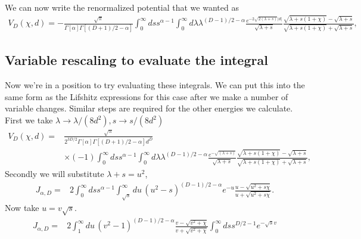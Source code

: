 We can now write the renormalized potential that we wanted as 
\begin{align}
V_D(\chi,d)=-\frac{\sqrt{\pi}}{\Gamma[\alpha]\Gamma\left[(D+1)/2-\alpha\right]}
\int_0^\infty ds s^{\alpha-1}\int_0^\infty d\lambda \lambda^{(D-1)/2-\alpha}
\frac{e^{-2\sqrt{2(\lambda+s)}|d|}}{\sqrt{\lambda+s}} 
\frac{\sqrt{\lambda+s(1+\chi)}-\sqrt{\lambda+s}}{\sqrt{\lambda+s(1+\chi)}+\sqrt{\lambda+s}},
\end{align}

\subsection{Variable rescaling to evaluate the integral}
Now we're in a position to try evaluating these integrals.
  We can put this into the same form as the Lifshitz expressions for this case after we make a number of variable changes.
  Similar steps are required for the other energies we calculate.  
First we take $\lambda \rightarrow \lambda/(8d^2), s\rightarrow s/(8d^2)$
\begin{align}
V_D(\chi,d)%
=&\frac{\sqrt{\pi}}{2^{3D/2}\Gamma[\alpha]\Gamma\left[(D+1)/2-\alpha\right]d^D}\nonumber \\
&\times(-1)\int_0^\infty ds s^{\alpha-1}\int_0^\infty d\lambda \lambda^{(D-1)/2-\alpha}
\frac{e^{-\sqrt{(\lambda+s)}}}{\sqrt{\lambda+s}} 
\frac{\sqrt{\lambda+s(1+\chi)}-\sqrt{\lambda+s}}{\sqrt{\lambda+s(1+\chi)}+\sqrt{\lambda+s}},
\end{align}
Secondly we will substitute $\lambda +s = u^2$,
\begin{align}
J_{\alpha,D} %
=& 2\int_0^\infty ds s^{\alpha-1}\int_{\sqrt{s}}^\infty du\, (u^2-s)^{(D-1)/2-\alpha}e^{-u} 
\frac{u-\sqrt{u^2+s\chi}}{u+\sqrt{u^2+s\chi  }}.
\end{align}
Now take $u = v\sqrt{s}$.  
\begin{align}
J_{\alpha,D} %
=& 2\int_{1}^\infty du\,(v^2-1)^{(D-1)/2-\alpha}\frac{v-\sqrt{v^2+\chi}}{v+\sqrt{v^2+\chi  }}
\int_0^\infty ds s^{D/2-1}e^{-\sqrt{s}v}
\end{align}

